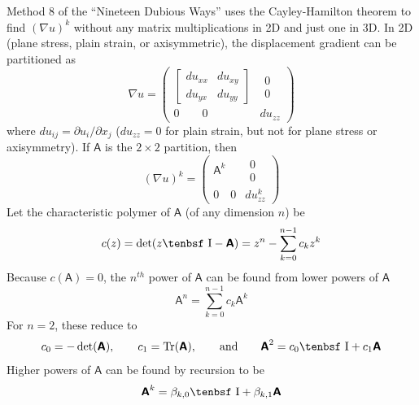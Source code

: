 \documentclass[11pt]{book}
\newcommand{\tens}[1]{\boldsymbol{\mathsf{#1}}}
\def\I{\hbox{\tenbsf I}}
\begin{document}
Method 8 of the ``Nineteen Dubious Ways'' uses the Cayley-Hamilton theorem to find $(\nabla u)^k$ without any matrix multiplications in 2D and just one in 3D. In 2D (plane stress, plain strain, or axisymmetric), the displacement gradient can be partitioned as
\begin{equation}
       \nabla u = \left(\begin{array}{cc}
               \left[\begin{array}{cc}
                      du_{xx} & du_{xy} \\
                      du_{yx} & du_{yy}
                     \end{array}\right] & \begin{array}{c} 0 \\ 0 \end{array} \\
                     0 \qquad 0  & du_{zz}
                 \end{array}\right)
\end{equation}
where $du_{ij} = \partial u_i/\partial x_j$ ($du_{zz}=0$ for plain strain, but not for plane stress or axisymmetry). If $\tens A$ is the $2\times2$ partition, then
\begin{equation}
    (\nabla u)^k = \left(\begin{array}{cc}
                \tens A^k & \begin{array}{c} 0 \\ 0 \end{array} \\
                 0 \quad 0  & du_{zz}^k
              \end{array}\right)
\end{equation}
Let the characteristic polymer of $\tens A$ (of any dimension $n$) be
\begin{equation}
    c(z) = \det(z\I - \tens A) = z^n - \sum_{k=0}^{n-1} c_k z^k
\end{equation}
Because $c(\tens A)=0$, the $n^{th}$ power of $\tens A$ can be found from lower powers of $\tens A$
\begin{equation}
     \tens A^n = \sum_{k=0}^{n-1} c_k \tens A^k
\end{equation}
For $n=2$, these reduce to
\begin{equation}
    c_0 = -\det(\tens A), \qquad c_1 = {\rm Tr}(\tens A), \qquad {\rm and} \qquad \tens A^2 = c_0\I + c_1\tens A
\end{equation}
Higher powers of $\tens A$ can be found by recursion to be
\begin{equation}
     \tens A^k = \beta_{k,0}\I + \beta_{k,1}\tens A
\end{equation}
\end{document}
